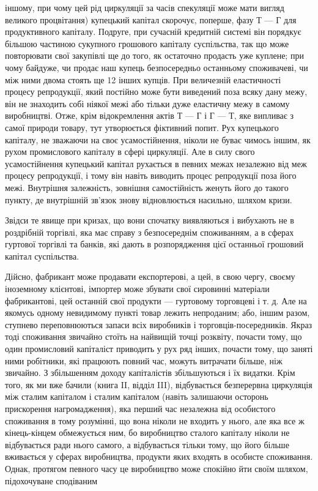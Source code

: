 іншому, при чому цей рід циркуляції за часів спекуляції може
мати вигляд великого процвітання) купецький капітал скорочує,
поперше, фазу Т — Г для продуктивного капіталу. Подруге, при
сучасній кредитній системі він порядкує більшою частиною
сукупного грошового капіталу суспільства, так що може повторювати
свої закупівлі ще до того, як остаточно продасть уже
куплене; при чому байдуже, чи продає наш купець безпосередньо
останньому споживачеві, чи між ними двома стоять ще
12 інших купців. При величезній еластичності процесу репродукції,
який постійно може бути виведений поза всяку дану
межу, він не знаходить собі ніякої межі або тільки дуже еластичну
межу в самому виробництві. Отже, крім відокремлення актів
Т — Г і Г — Т, яке випливає з самої природи товару, тут утворюється
фіктивний попит. Рух купецького капіталу, не зважаючи
на своє усамостійнення, ніколи не буває чимось іншим, як рухом
промислового капіталу в сфері циркуляції. Але в силу свого
усамостійнення купецький капітал рухається в певних межах незалежно
від меж процесу репродукції, і тому він навіть виводить
процес репродукції поза його межі. Внутрішня залежність, зовнішня
самостійність женуть його до такого пункту, де внутрішній
зв’язок знову відновлюється насильно, шляхом кризи.

Звідси те явище при кризах, що вони спочатку виявляються
і вибухають не в роздрібній торгівлі, яка має справу з безпосереднім
споживанням, а в сферах гуртової торгівлі та банків,
які дають в розпорядження цієї останньої грошовий капітал
суспільства.

Дійсно, фабрикант може продавати експортерові, а цей, в свою
чергу, своєму іноземному клієнтові, імпортер може збувати
свої сировинні матеріали фабрикантові, цей останній свої продукти
— гуртовому торговцеві і т. д. Але на якомусь одному
невидимому пункті товар лежить непроданим; або, іншим разом,
ступнево переповнюються запаси всіх виробників і торговців-посередників.
Якраз тоді споживання звичайно стоїть на найвищій
точці розквіту, почасти тому, що один промисловий капіталіст
приводить у рух ряд інших, почасти тому, що заняті
ними робітники, які працюють повний час, можуть витрачати
більше, ніж звичайно. З збільшенням доходу капіталістів збільшуються
і їх видатки. Крім того, як ми вже бачили (книга II,
відділ III), відбувається безперервна циркуляція між сталим капіталом
і сталим капіталом (навіть залишаючи осторонь прискорення
нагромадження), яка перший час незалежна від особистого
споживання в тому розумінні, що вона ніколи не входить
у нього, але яка все ж кінець-кінцем обмежується ним,
бо виробництво сталого капіталу ніколи не відбувається ради
нього самого, а відбувається тільки тому, що його більше
вживається у сферах виробництва, продукти яких входять в особисте
споживання. Однак, протягом певного часу це виробництво
може спокійно йти своїм шляхом, підохочуване сподіваним
